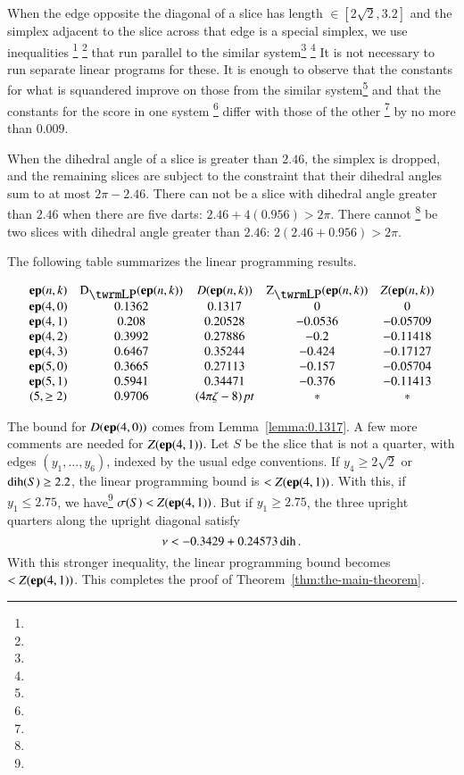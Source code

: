 When the edge opposite the diagonal of a slice has length
$\in[2\sqrt{2},3.2]$ and the simplex adjacent to the slice
across that edge is a special simplex, we use inequalities%
\footnote{} %
\footnote{} %
that run parallel to the similar system\footnote{} %
\footnote{} %
It is not
necessary to run separate linear programs for these.  It is enough to
observe that the constants for what is squandered improve on those from
the similar system\footnote{} %
and that the constants for the score in one system%
\footnote{} %
differ with those of the other%
\footnote{} %
by no more than $0.009$.

When the dihedral angle of a slice is greater than $2.46$,
the simplex is dropped, and the remaining slices are subject
to the constraint that their dihedral angles sum to at most $2\pi-2.46$.
There can not be a slice with dihedral angle greater than
$2.46$ when there are five darts: $2.46+4 (0.956)>2\pi$. There cannot%
\footnote{} %
be two slices with dihedral angle greater than $2.46$:
$2(2.46+0.956)>2\pi$.

The following table summarizes the linear programming results.

$$
\begin{matrix}
\y{(n,k)}   &   \DLP(\y{(n,k)}) & D(\y{(n,k)})      &\ZLP(\y{(n,k)})  &Z(\y{(n,k)})\\
\y{(4,0)}   &   0.1362  &   0.1317  &   0   &   0\\
\y{(4,1)}   &   0.208   &   0.20528 &-0.0536&   -0.05709\\
\y{(4,2)}   &   0.3992  &   0.27886 &-0.2   &   -0.11418\\
\y{(4,3)}   &  0.6467   &   0.35244 &-0.424 &   -0.17127\\
\y{(5,0)}   &   0.3665  &   0.27113 &-0.157 &   -0.05704\\
\y{(5,1)}   &  0.5941   &   0.34471 &-0.376 &   -0.11413\\
(5,\ge2)&  0.9706   &  \squander    &*          &   *
\end{matrix}
$$

The bound for $D({\operatorname{\bf ep}}{(4,0)})$ comes from Lemma~\ref{lemma:0.1317}. A few
more comments are needed for $Z({\operatorname{\bf ep}}{(4,1)})$.  Let $S$
be the slice that is not a quarter, with edges $(y_1,\ldots,y_6)$,
indexed by the usual edge conventions.  If $y_4\ge2\sqrt2$
or $\operatorname{dih}(S)\ge 2.2$, the linear programming bound is $<Z({\operatorname{\bf ep}}{(4,1)})$.
With this, if $y_1\le 2.75$, we have\footnote{} %
    $\sigma(S) < Z({\operatorname{\bf ep}}{(4,1)})$.
But if $y_1\ge2.75$, the three upright quarters along the upright
diagonal satisfy
    $$\nu< -0.3429+0.24573\operatorname{dih}.$$
With this stronger inequality, the linear programming bound becomes
$<Z({\operatorname{\bf ep}}{(4,1)})$. This completes the proof of
Theorem~\ref{thm:the-main-theorem}.

